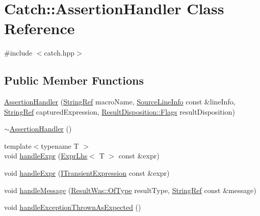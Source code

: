 \hypertarget{class_catch_1_1_assertion_handler}{}\section{Catch\+:\+:Assertion\+Handler Class Reference}
\label{class_catch_1_1_assertion_handler}


{\ttfamily \#include $<$catch.\+hpp$>$}

\subsection*{Public Member Functions}
\begin{DoxyCompactItemize}
\item 
\mbox{\hyperlink{class_catch_1_1_assertion_handler_a74627e1e399b026e9acbaf95ea673643}{Assertion\+Handler}} (\mbox{\hyperlink{class_catch_1_1_string_ref}{String\+Ref}} macro\+Name, \mbox{\hyperlink{struct_catch_1_1_source_line_info}{Source\+Line\+Info}} const \&line\+Info, \mbox{\hyperlink{class_catch_1_1_string_ref}{String\+Ref}} captured\+Expression, \mbox{\hyperlink{struct_catch_1_1_result_disposition_a3396cad6e2259af326b3aae93e23e9d8}{Result\+Disposition\+::\+Flags}} result\+Disposition)
\item 
\mbox{\hyperlink{class_catch_1_1_assertion_handler_a1e839d810f6ac0fa6d127fe8350175ed}{$\sim$\+Assertion\+Handler}} ()
\item 
{\footnotesize template$<$typename T $>$ }\\void \mbox{\hyperlink{class_catch_1_1_assertion_handler_a2ef387e567bad90ec6e4b5bf5c367388}{handle\+Expr}} (\mbox{\hyperlink{class_catch_1_1_expr_lhs}{Expr\+Lhs}}$<$ T $>$ const \&expr)
\item 
void \mbox{\hyperlink{class_catch_1_1_assertion_handler_afe14d9cf1b1c7f70dae439fbdb51d0c4}{handle\+Expr}} (\mbox{\hyperlink{struct_catch_1_1_i_transient_expression}{I\+Transient\+Expression}} const \&expr)
\item 
void \mbox{\hyperlink{class_catch_1_1_assertion_handler_abdb4c180ed83ec2858b2fb87712c516d}{handle\+Message}} (\mbox{\hyperlink{struct_catch_1_1_result_was_a624e1ee3661fcf6094ceef1f654601ef}{Result\+Was\+::\+Of\+Type}} result\+Type, \mbox{\hyperlink{class_catch_1_1_string_ref}{String\+Ref}} const \&message)
\item 
void \mbox{\hyperlink{class_catch_1_1_assertion_handler_ab6caf765764a4064e90fce829eec201d}{handle\+Exception\+Thrown\+As\+Expected}} ()
\item 

\end{DoxyCompactItemize}
